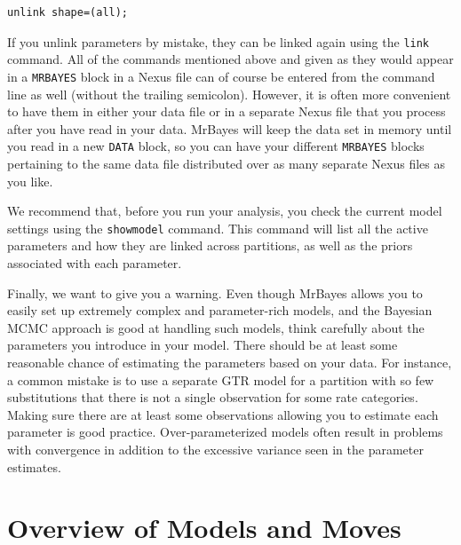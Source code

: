 \documentclass[12pt]{book}
\begin{document}
\begin{Verbatim}
unlink shape=(all);
\end{Verbatim}

If you unlink parameters by mistake, they can be linked again using the \texttt{link} command. All
of the commands mentioned above and given as they would appear in a \texttt{MRBAYES} block in a
Nexus file can of course be entered from the command line as well (without the trailing semicolon).
However, it is often more convenient to have them in either your data file or in a separate Nexus
file that you process after you have read in your data. MrBayes will keep the data set in memory
until you read in a new \texttt{DATA} block, so you can have your different \texttt{MRBAYES} blocks
pertaining to the same data file distributed over as many separate Nexus files as you like.

We recommend that, before you run your analysis, you check the current model settings using the
\texttt{showmodel} command. This command will list all the active parameters and how they are
linked across partitions, as well as the priors associated with each parameter.

Finally, we want to give you a warning. Even though MrBayes allows you to easily set up extremely
complex and parameter-rich models, and the Bayesian MCMC approach is good at handling such models,
think carefully about the parameters you introduce in your model. There should be at least some
reasonable chance of estimating the parameters based on your data. For instance, a common mistake
is to use a separate GTR model for a partition with so few substitutions that there is not a single
observation for some rate categories. Making sure there are at least some observations allowing you
to estimate each parameter is good practice. Over-parameterized models often result in problems
with convergence in addition to the excessive variance seen in the parameter estimates.

\appendix

\chapter{Overview of Models and Moves}\label{appendixOverview}
\end{document}
